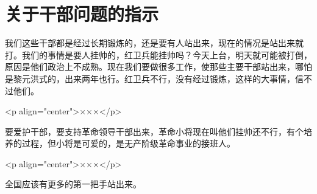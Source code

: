 \section[关于干部问题的指示（一九六七年六月）]{关于干部问题的指示}


我们这些干部都是经过长期锻炼的，还是要有人站出来，现在的情况是站出来就打。我们的事情是要人挂帅的，红卫兵能挂帅吗？今天上台，明天就可能被打倒，原因是他们政治上不成熟。现在我们要做很多工作，使那些主要干部站出来，哪怕是黎元洪式的，出来两年也行。红卫兵不行，没有经过锻炼，这样的大事情，信不过他们。

<p align="center">×××</p>

要爱护干部，要支持革命领导干部出来，革命小将现在叫他们挂帅还不行，有个培养的过程，但小将是可爱的，是无产阶级革命事业的接班人。

<p align="center">×××</p>

全国应该有更多的第一把手站出来。

